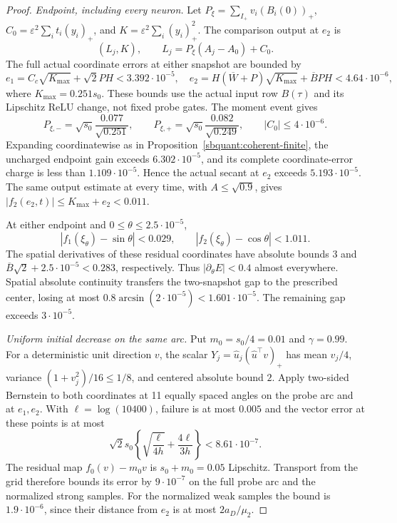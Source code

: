 \documentclass[11pt]{article}
\theoremstyle{remark}
\begin{document}
\begin{proof}
\emph{Endpoint, including every neuron.}
Let $P_\xi=\sum_{I_+}v_i(B_i(0))_+$,
$C_0=\varepsilon^2\sum_i t_i(y_i)_+$, and
$K=\varepsilon^2\sum_i(y_i)_+^2$.
The comparison output at $e_2$ is
\[
 (L_j,K),\qquad L_j=P_\xi(A_j-A_0)+C_0.
\]
The full actual coordinate errors at either snapshot are bounded by
\[
 e_1=C_c\sqrt{K_{\max}}+\sqrt2PH<3.392\cdot10^{-5},
 \quad
 e_2=H(\overline W+P)\sqrt{K_{\max}}+\overline BPH
       <4.64\cdot10^{-6},
\]
where $K_{\max}=0.251s_0$. These bounds use the actual input row
$B(\tau)$ and its Lipschitz ReLU change, not fixed probe gates.
The moment event gives
\[
 P_{\xi,-}=\sqrt{s_0}\frac{0.077}{\sqrt{0.251}},\qquad
 P_{\xi,+}=\sqrt{s_0}\frac{0.082}{\sqrt{0.249}},\qquad
 |C_0|\le4\cdot10^{-6}.
\]
Expanding coordinatewise as in
Proposition~\ref{sbquant:coherent-finite}, the uncharged endpoint gain
exceeds $6.302\cdot10^{-5}$, and its complete coordinate-error charge
is less than $1.109\cdot10^{-5}$. Hence the actual secant at $e_2$
exceeds $5.193\cdot10^{-5}$.
The same output estimate at every time, with $A\le\sqrt{0.9}$,
gives $|f_2(e_2,t)|\le K_{\max}+e_2<0.011$.

At either endpoint and $0\le\theta\le2.5\cdot10^{-5}$,
\[
 |f_1(\xi_\theta)-\sin\theta|<0.029,
 \qquad |f_2(\xi_\theta)-\cos\theta|<1.011.
\]
The spatial derivatives of these residual coordinates have absolute
bounds $3$ and $\overline B\sqrt2+2.5\cdot10^{-5}<0.283$, respectively.
Thus $|\partial_\theta E|<0.4$ almost everywhere. Spatial absolute
continuity transfers the two-snapshot gap to the prescribed center,
losing at most $0.8\arcsin(2\cdot10^{-5})<1.601\cdot10^{-5}$.
The remaining gap exceeds $3\cdot10^{-5}$.

\emph{Uniform initial decrease on the same arc.}
Put $m_0=s_0/4=0.01$ and $\gamma=0.99$.
For a deterministic unit direction $v$, the scalar
$Y_j=\widehat u_j(\widehat u^\top v)_+$ has mean $v_j/4$,
variance $(1+v_j^2)/16\le1/8$, and centered absolute bound $2$.
Apply two-sided Bernstein to both coordinates at 11 equally spaced
angles on the probe arc and at $e_1,e_2$. With
$\ell=\log(10400)$, failure is at most $0.005$ and the vector error
at these points is at most
\[
 \sqrt2s_0\left\{\sqrt{\frac\ell{4h}}+
                         \frac{4\ell}{3h}\right\}<8.61\cdot10^{-7}.
\]
The residual map $f_0(v)-m_0v$ is $s_0+m_0=0.05$ Lipschitz.
Transport from the grid therefore bounds its error by $9\cdot10^{-7}$
on the full probe arc and the normalized strong samples. For the
normalized weak samples the bound is $1.9\cdot10^{-6}$, since their
distance from $e_2$ is at most $2a_D/\mu_2$.


\end{proof}
\end{document}
